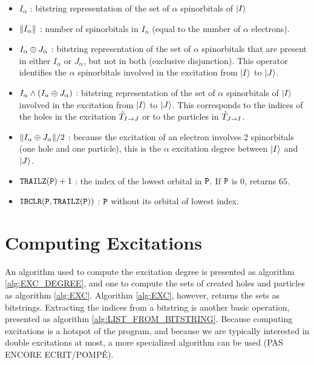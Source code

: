 \documentclass[./thesis.tex]{subfiles}
\begin{document}
\begin{itemize}
	      
	\item $I_{\alpha}$ : bitstring representation of the set of $\alpha$ spinorbitals of ${\ket{I}}$
	            
	\item $\norm{I_{\alpha}}$ : number of spinorbitals in $I_{\alpha}$ (equal to the number of $\alpha$ electrons).
	            
	\item $I_{\alpha} \oplus J_{\alpha}$ : bitstring representation of the set of $\alpha$ spinorbitals that are present in either $I_{\alpha}$ or $J_{\alpha}$, but not in both (exclusive disjunction).
        This operator identifies the $\alpha$ spinorbitals involved in the excitation from ${\ket{I}}$ to ${\ket{J}}$. 
	            
	\item $I_{\alpha} \wedge \qty(I_{\alpha} \oplus J_{\alpha})$ : 
        bitstring representation of the set of $\alpha$ spinorbitals of ${\ket{I}}$ involved in the excitation from ${\ket{I}}$ to ${\ket{J}}$. This corresponds to the indices of the holes in the excitation ${\hat{T}_{I \rightarrow J}}$ or to the particles in ${\hat{T}_{J \rightarrow I}}$. 
	            
	\item $\norm{I_{\alpha} \oplus J_{\alpha}}/2$ : because the excitation of an electron involves 2 spinorbitals (one hole and one particle), this is the $\alpha$ excitation degree between ${\ket{I}}$ and ${\ket{J}}$.
	            
	\item $\text{\texttt{TRAILZ}}({\texttt{P}})+1$ : the index of the lowest orbital in ${\texttt{P}}$. If ${\texttt{P}}$ is $0$, returns $65$.
	            
	\item $\text{\texttt{IBCLR}}({\texttt{P}},\text{\texttt{TRAILZ}}({\texttt{P}}))$ : ${\texttt{P}}$ without its orbital of lowest index.

\end{itemize}


\section{Computing Excitations}

An algorithm used to compute the excitation degree is presented as algorithm \ref{alg:EXC_DEGREE}, and one to compute the sets of created holes and particles as algorithm \ref{alg:EXC}. Algorithm \ref{alg:EXC}, however, returns the sets as bitstrings. Extracting the indices from a bitstring is another basic operation, presented as algorithm \ref{alg:LIST_FROM_BITSTRING}.
Because computing excitations is a hotspot of the program, and because we are typically interested in double excitations at most, a more specialized algorithm can be used (\alert{PAS ENCORE ECRIT/POMPÉ}).
\end{document}
